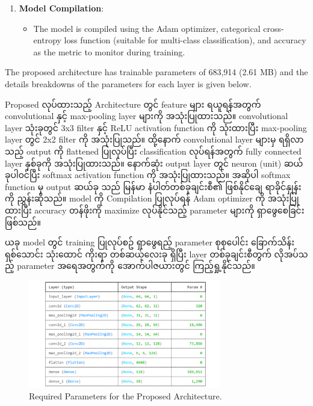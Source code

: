 \begin{enumerate}
    \item \textbf{Model Compilation}:
        \begin{itemize}
            \item The model is compiled using the Adam optimizer, categorical cross-entropy loss function (suitable for multi-class classification), and accuracy as the metric to monitor during training.
        \end{itemize}
\end{enumerate}

The proposed architecture has trainable parameters of 683,914 (2.61 MB) and the details breakdowns of the parameters for each layer is given below. 

Proposed လုပ်ထားသည့် Architecture တွင် feature များ ရယူရန်အတွက် convolutional နှင့် max-pooling layer များကို အသုံးပြုထားသည်။ convolutional layer သုံးခုတွင် 3x3 filter နှင့်  ReLU activation function ကို သုံးထားပြီး max-pooling layer တွင် 2x2 filter ကို အသုံးပြုသည်။ ထို့နောက် convolutional layer များမှ ရရှိလာသည့် output ကို flattened ပြုလုပ်ပြီး classification လုပ်ရန်အတွက် fully connected layer နှစ်ခုကို အသုံးပြုထားသည်။ နောက်ဆုံး output layer တွင် neuron (unit) ဆယ်ခုပါ၀င်ပြီး softmax activation function ကို အသုံးပြုထားသည်။ အဆိုပါ softmax function မှ  output ဆယ်ခု သည် မြန်မာ နံပါတ်တစ်ခုချင်းစီ၏ ဖြစ်နိုင်ချေ ရာခိုင်နှုန်းကို ညွှန်းဆိုသည်။ model ကို Compilation ပြုလုပ်ရန် Adam optimizer ကို အသုံးပြုထားပြီး accuracy တန်ဖိုးကို maximize လုပ်နိုင်သည့် parameter များကို ရှာဖွေစေခြင်းဖြစ်သည်။ 

ယခု model တွင် training ပြုလုပ်စဥ် ရှာဖွေရည့် parameter စုစုပေါင်း ခြောက်သိန်း ရှစ်သောင်း သုံးထောင် ကိုးရာ တစ်ဆယ့်လေးခု ရှိပြီး layer တစ်ခုချင်းစီတွက် လိုအပ်သည့် parameter အရေအတွက်ကို အောက်ပါဇယားတွင် ကြည့်ရှု့နိုင်သည်။ 

\vspace{0.5em}
\begin{figure}[h]%
\centering 
\includegraphics[width=0.75\textwidth]{imgs/p2_parameters.png}
\caption{Required Parameters for the Proposed Architecture.}\label{fig:p2Para}
\end{figure}
